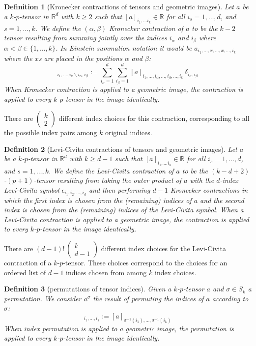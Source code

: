 \documentclass{article}
\theoremstyle{plain}
\newtheorem{definition}{Definition}
\renewcommand{\choose}[2]{\begin{pmatrix}{#1}\\{#2}\end{pmatrix}}
\begin{document}
\begin{definition}[Kronecker contractions of tensors and geometric images]
Let $a$ be a $k$-$p$-tensor in $\mathbb R^d$ with $k\geq 2$ such that $[a]_{i_1,\ldots i_k}\in \mathbb R$ for all $i_s = 1,\ldots, d$, and $s=1,\ldots, k$. We define the $(\alpha,\beta)$ Kronecker contraction of $a$ to be the $k-2$ tensor resulting from summing jointly over the indices $i_\alpha$ and $i_\beta$ where $\alpha < \beta \in\{1,\ldots, k\}$. In Einstein summation notation it would be $a_{i_1, \ldots, x, \ldots , x, \ldots, i_k}$ where the $x$s are placed in the positions $\alpha$ and $\beta$:
\begin{equation}
[a^{(\alpha,\beta)}]_{i_1, \ldots, i_k \backslash i_\alpha,i_\beta} := \sum_{i_\alpha=1}^d \sum_{i_\beta=1}^d [a]_{i_1, \ldots, i_\alpha,\ldots,i_\beta,\ldots, i_k}\,\delta_{i_\alpha, i_\beta}
\end{equation}
When Kronecker contraction is applied to a geometric image, the contraction is applied to every $k$-$p$-tensor in the image identically.
\end{definition}
There are $\choose{k}{2}$ different index choices for this contraction, corresponding to all the possible index pairs among $k$ original indices.

\begin{definition}[Levi-Civita contractions of tensors and geometric images]
Let $a$ be a $k$-$p$-tensor in $\mathbb R^d$ with $k\geq d-1$ such that $[a]_{i_1,\ldots i_k}\in \mathbb R$ for all $i_s = 1,\ldots, d$, and $s=1,\ldots, k$. We define the Levi-Civita contraction of $a$ to be the $(k-d+2)$-$(p+1)$-tensor resulting from taking the outer product of 
$a$ with the $d$-index Levi-Civita symbol $\epsilon_{i_1,i_2,\ldots,i_d}$ and then performing $d-1$ Kronecker contractions in which the first index is chosen from the (remaining) indices of $a$ and the second index is chosen from the (remaining) indices of the Levi-Civita symbol.
When a Levi-Civita contraction is applied to a geometric image, the contraction is applied to every $k$-$p$-tensor in the image identically.
\end{definition}
There are $(d-1)!\,\choose{k}{d-1}$ different index choices for the Levi-Civita contraction of a $k$-$p$-tensor.
These choices correspond to the choices for an ordered list of $d-1$ indices chosen from among $k$ index choices.

\begin{definition}[permutations of tensor indices]
Given a $k$-$p$-tensor $a$ and $\sigma\in S_k$ a permutation. We consider $a^\sigma$ the result of permuting the indices of $a$ according to $\sigma$:
\begin{equation}
    [a^\sigma]_{i_1, \ldots, i_k} := [a]_{\sigma^{-1}(i_1), \ldots, \sigma^{-1}(i_k)}
\end{equation}
When index permutation is applied to a geometric image, the permutation is applied to every $k$-$p$-tensor in the image identically.
\end{definition}
\end{document}
